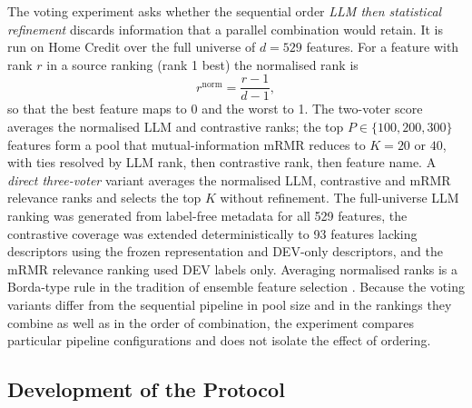 \documentclass[final,5p,twocolumn]{elsarticle}
\newcommand{\Kfeat}{K}
\begin{document}
The voting experiment asks whether the sequential order \emph{LLM then statistical refinement} discards information that a parallel combination would retain. It is run on Home Credit over the full universe of $d=529$ features. For a feature with rank $r$ in a source ranking (rank 1 best) the normalised rank is
\begin{equation}
    r^{\mathrm{norm}}=\frac{r-1}{d-1},
    \label{eq:normrank}
\end{equation}
so that the best feature maps to 0 and the worst to 1. The two-voter score averages the normalised LLM and contrastive ranks; the top $P\in\{100,200,300\}$ features form a pool that mutual-information mRMR reduces to $\Kfeat=20$ or $40$, with ties resolved by LLM rank, then contrastive rank, then feature name. A \emph{direct three-voter} variant averages the normalised LLM, contrastive and mRMR relevance ranks and selects the top $\Kfeat$ without refinement. The full-universe LLM ranking was generated from label-free metadata for all 529 features, the contrastive coverage was extended deterministically to 93 features lacking descriptors using the frozen representation and DEV-only descriptors, and the mRMR relevance ranking used DEV labels only. Averaging normalised ranks is a Borda-type rule \cite{dwork2001} in the tradition of ensemble feature selection \cite{saeys2008}. Because the voting variants differ from the sequential pipeline in pool size and in the rankings they combine as well as in the order of combination, the experiment compares particular pipeline configurations and does not isolate the effect of ordering.

\subsection{Development of the Protocol}
\label{subsec:protocol_development}
\end{document}
